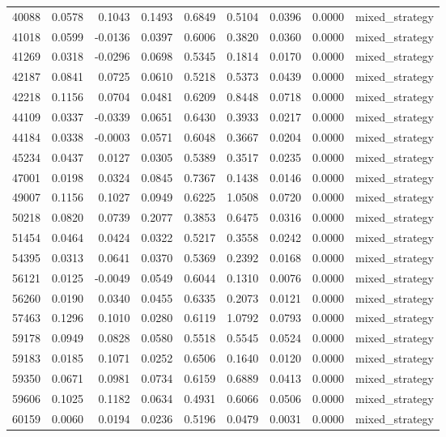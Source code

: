 \begin{tabular}{lrrrrrrrl}
40088 & 0.0578 & 0.1043 & 0.1493 & 0.6849 & 0.5104 & 0.0396 & 0.0000 & mixed_strategy \\
41018 & 0.0599 & -0.0136 & 0.0397 & 0.6006 & 0.3820 & 0.0360 & 0.0000 & mixed_strategy \\
41269 & 0.0318 & -0.0296 & 0.0698 & 0.5345 & 0.1814 & 0.0170 & 0.0000 & mixed_strategy \\
42187 & 0.0841 & 0.0725 & 0.0610 & 0.5218 & 0.5373 & 0.0439 & 0.0000 & mixed_strategy \\
42218 & 0.1156 & 0.0704 & 0.0481 & 0.6209 & 0.8448 & 0.0718 & 0.0000 & mixed_strategy \\
44109 & 0.0337 & -0.0339 & 0.0651 & 0.6430 & 0.3933 & 0.0217 & 0.0000 & mixed_strategy \\
44184 & 0.0338 & -0.0003 & 0.0571 & 0.6048 & 0.3667 & 0.0204 & 0.0000 & mixed_strategy \\
45234 & 0.0437 & 0.0127 & 0.0305 & 0.5389 & 0.3517 & 0.0235 & 0.0000 & mixed_strategy \\
47001 & 0.0198 & 0.0324 & 0.0845 & 0.7367 & 0.1438 & 0.0146 & 0.0000 & mixed_strategy \\
49007 & 0.1156 & 0.1027 & 0.0949 & 0.6225 & 1.0508 & 0.0720 & 0.0000 & mixed_strategy \\
50218 & 0.0820 & 0.0739 & 0.2077 & 0.3853 & 0.6475 & 0.0316 & 0.0000 & mixed_strategy \\
51454 & 0.0464 & 0.0424 & 0.0322 & 0.5217 & 0.3558 & 0.0242 & 0.0000 & mixed_strategy \\
54395 & 0.0313 & 0.0641 & 0.0370 & 0.5369 & 0.2392 & 0.0168 & 0.0000 & mixed_strategy \\
56121 & 0.0125 & -0.0049 & 0.0549 & 0.6044 & 0.1310 & 0.0076 & 0.0000 & mixed_strategy \\
56260 & 0.0190 & 0.0340 & 0.0455 & 0.6335 & 0.2073 & 0.0121 & 0.0000 & mixed_strategy \\
57463 & 0.1296 & 0.1010 & 0.0280 & 0.6119 & 1.0792 & 0.0793 & 0.0000 & mixed_strategy \\
59178 & 0.0949 & 0.0828 & 0.0580 & 0.5518 & 0.5545 & 0.0524 & 0.0000 & mixed_strategy \\
59183 & 0.0185 & 0.1071 & 0.0252 & 0.6506 & 0.1640 & 0.0120 & 0.0000 & mixed_strategy \\
59350 & 0.0671 & 0.0981 & 0.0734 & 0.6159 & 0.6889 & 0.0413 & 0.0000 & mixed_strategy \\
59606 & 0.1025 & 0.1182 & 0.0634 & 0.4931 & 0.6066 & 0.0506 & 0.0000 & mixed_strategy \\
60159 & 0.0060 & 0.0194 & 0.0236 & 0.5196 & 0.0479 & 0.0031 & 0.0000 & mixed_strategy \\

\end{tabular}
